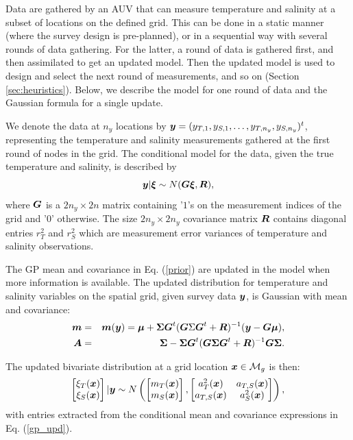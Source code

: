 \documentclass[aoas]{imsart}
\begin{document}
Data are gathered by an AUV that can measure temperature and salinity
at a subset of locations on the defined grid. This can be done in a
static manner (where the survey design is pre-planned), or in a
sequential way with several rounds of data gathering. For the latter,
a round of data is gathered first, and then assimilated to get an
updated model. Then the updated model is used to design and select the
next round of measurements, and so on (Section \ref{sec:heuristics}). Below, we describe the model for one round of data and the Gaussian formula for a single update.

We denote the data at $n_y$ locations by
${\boldsymbol y}=(y_{T,1},y_{S,1},\ldots,y_{T,n_y},y_{S,n_y})^t$, representing the
temperature and salinity measurements gathered at the first round of
nodes in the grid. The conditional model for the data, given the true temperature
and salinity, is described by 
\begin{equation}\label{likelihood}
\by | \bxi \sim N( \bG \bxi, \bR), %
\end{equation}
where ${\boldsymbol G}$ is a $2n_y \times 2n$ matrix containing '$1$'s on the
measurement indices of the grid and '$0$' otherwise. The size
$2n_y \times 2n_y$ covariance matrix ${\boldsymbol R}$ contains diagonal entries
$r^2_T$ and $r^2_S$ which are measurement error variances of
temperature and salinity observations.

The GP mean and covariance in Eq. (\ref{prior}) are updated in the model when more information is available. The
updated distribution for temperature and salinity variables on the
spatial grid, given survey data ${\boldsymbol y}$, is Gaussian with mean and
covariance: 
\begin{eqnarray}\label{gp_upd}
  \bm &=& \bm(\by) = \bmu+\bSigma \bG^t (\bG \Sigma \bG^t+\bR)^{-1}(\by-\bG \bmu),  \\
  \bA &=& \bSigma - \bSigma \bG^t (\bG \bSigma \bG^t+\bR)^{-1} \bG
          \bSigma.\nonumber
\end{eqnarray}

The updated bivariate distribution at a grid location ${\boldsymbol x} \in
\mathcal{M}_g$ is then: 
\begin{equation}\label{gp_hat}
\begin{bmatrix}
\xi_T(\bx) \\
\xi_S(\bx)
\end{bmatrix}
 |\by
 \sim N \left( 
\begin{bmatrix} m_{T}(\bx)\\
m_{S}(\bx)
\end{bmatrix},\begin{bmatrix}
a_{T}^2(\bx) & a_{T,S}(\bx)  \\
a_{T,S}(\bx)  & a_{S}^2(\bx)  
\end{bmatrix}
\right),
\end{equation}
with entries extracted from the conditional mean and covariance
expressions in Eq. (\ref{gp_upd}).
\end{document}
